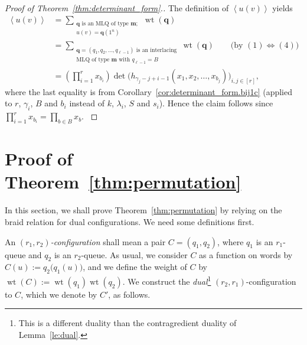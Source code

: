 \documentclass[reqno]{amsart}
\newcommand{\0}{\phantom{c}}
\newcommand{\swt}[1]{\left\langle #1 \right\rangle} %
\DeclareMathOperator{\wt}{wt} %
\newcommand{\mm}{\mathbf{m}}
\newcommand{\qq}{\mathbf{q}}
\let\sumnonlimits\sum
\let\prodnonlimits\prod
\renewcommand{\sum}{\sumnonlimits\limits}
\renewcommand{\prod}{\prodnonlimits\limits}
\newenvironment{verlong}{}{}
\newcommand{\tup}[1]{\left( #1 \right)}
\newcommand{\ive}[1]{\left[ #1 \right]}
\newcommand{\defn}[1]{{\color{darkred}\emph{#1}}} %
\theoremstyle{plain}
\theoremstyle{definition}
\numberwithin{equation}{section}
\begin{document}
\begin{proof}[Proof of Theorem~\ref{thm:determinant_form}.]
The definition of $\swt{u(v)}$ yields
\begin{align*}
\swt{u(v)} & = \sum_{\substack{\qq \text{ is an MLQ of type } \mm; \\ u(v)=\qq(1^n)}}\wt(\qq) \\
&  = \sum_{\substack{\qq = \tup{q_1, q_2, \dotsc, q_{\ell-1}} \text{ is an interlacing} \\\text{MLQ of type } \mm \text{ with } q_{\ell-1}=B}} \wt(\qq) \qquad \text{(by $(1) \Longleftrightarrow (4)$)} \\
&  = \left(  \prod_{i=1}^r x_{b_i} \right) \det\biggl( h_{\gamma_j-j+i-1}\left(x_1,x_2,\ldots,x_{b_j}\right)  \biggr)_{i, j \in \ive{r}} ,
\end{align*}
where the last equality is from Corollary~\ref{cor:determinant_form.bij1c} (applied to $r$, $\gamma_i$, $B$ and $b_i$ instead of $k$, $\lambda_i$, $S$ and $s_i$).
\begin{verlong}
Hence the claim follows since $\prod_{i=1}^r x_{b_i} = \prod_{b \in B} x_b$.
\end{verlong}
\end{proof}












\section{Proof of Theorem~\ref{thm:permutation}}
\label{sec:thm_proof}

In this section, we shall prove Theorem~\ref{thm:permutation} by relying on the
braid relation for dual configurations. We need some definitions first.

An \defn{$(r_1,r_2)$-configuration} shall mean a pair $C = (q_1, q_2)$, where $q_1$ is an $r_1$-queue and $q_2$ is an $r_2$-queue.
As usual, we consider $C$ as a function on words by $C(u) := q_2\bigl(q_1(u)\bigr)$, and we define the weight of $C$ by $\wt(C) := \wt(q_1) \wt(q_2)$.
We construct the \defn{dual}\footnote{This is a different duality than the contragredient duality of Lemma~\ref{le:dual}.} $(r_2,r_1)$-configuration to $C$, which we denote by $C'$, as follows.
\end{document}
